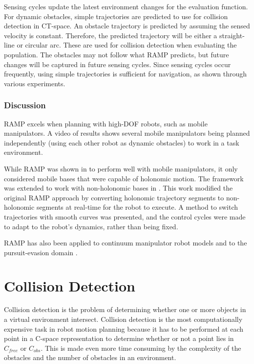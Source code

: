 \documentclass[10pt,conference]{ieeeconf}
\begin{document}
Sensing cycles update the latest environment changes for the evaluation function. For dynamic obstacles, simple trajectories are predicted to use for collision detection in CT-space. An obstacle trajectory is predicted by assuming the sensed velocity is constant. Therefore, the predicted trajectory will be either a straight-line or circular arc. These are used for collision detection when evaluating the population. The obstacles may not follow what RAMP predicts, but future changes will be captured in future sensing cycles. Since sensing cycles occur frequently, using simple trajectories is sufficient for navigation, as shown through various experiments.


\subsubsection{Discussion}

RAMP excels when planning with high-DOF robots, such as mobile manipulators. A video of results shows several mobile manipulators being planned independently (using each other robot as dynamic obstacles) to work in a task environment.

While RAMP was shown in \cite{RAMP} to perform well with mobile manipulators, it only considered mobile bases that were capable of holonomic motion. The framework was extended to work with non-holonomic bases in \cite{mcleod2016real}. This work modified the original RAMP approach by converting holonomic trajectory segments to non-holonomic segments at real-time for the robot to execute. A method to switch trajectories with smooth curves was presented, and the control cycles were made to adapt to the robot's dynamics, rather than being fixed.

RAMP has also been applied to continuum manipulator robot models \cite{xiao2010real} and to the pursuit-evasion domain \cite{annas2009intelligent}.



\section{Collision Detection}
	
	Collision detection is the problem of determining whether one or more objects in a virtual environment intersect. Collision detection is the most computationally expensive task in robot motion planning because it has to be performed at each point in a C-space representation to determine whether or not a point lies in $C_{free}$ or $C_{obs}$. This is made even more time consuming by the complexity of the obstacles and the number of obstacles in an environment.
	
\end{document}
